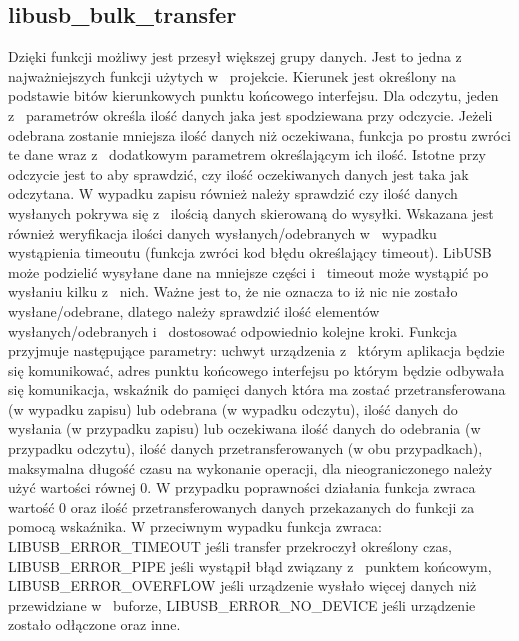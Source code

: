 \documentclass{BscUS}
\begin{document}
\subsection{libusb\_bulk\_transfer}
\indent Dzięki funkcji możliwy jest przesył większej grupy danych. Jest to jedna z~ najważniejszych funkcji użytych w~ projekcie.
Kierunek jest określony na podstawie bitów kierunkowych punktu końcowego interfejsu.
Dla odczytu, jeden z~ parametrów określa ilość danych jaka jest spodziewana przy odczycie. Jeżeli odebrana zostanie mniejsza ilość danych niż oczekiwana, funkcja po prostu zwróci te dane wraz z~ dodatkowym parametrem określającym ich ilość. Istotne przy odczycie jest to aby sprawdzić, czy ilość oczekiwanych danych jest taka jak odczytana.
W wypadku zapisu również należy sprawdzić czy ilość danych wysłanych pokrywa się z~ ilością danych skierowaną do wysyłki.
Wskazana jest również weryfikacja ilości danych wysłanych/odebranych w~ wypadku wystąpienia timeoutu (funkcja zwróci kod błędu określający timeout). LibUSB może podzielić wysyłane dane na mniejsze części i~ timeout może wystąpić po wysłaniu kilku z~ nich. Ważne jest to, że nie oznacza to iż nic nie zostało wysłane/odebrane, dlatego należy sprawdzić ilość elementów wysłanych/odebranych i~ dostosować odpowiednio kolejne kroki.
Funkcja przyjmuje następujące parametry: uchwyt urządzenia z~ którym aplikacja będzie się komunikować, adres punktu końcowego interfejsu po którym będzie odbywała się komunikacja, wskaźnik do pamięci danych która ma zostać przetransferowana (w wypadku zapisu) lub odebrana (w wypadku odczytu), ilość danych do wysłania (w przypadku zapisu) lub oczekiwana ilość danych do odebrania (w przypadku odczytu), ilość danych przetransferowanych (w obu przypadkach), maksymalna długość czasu na wykonanie operacji, dla nieograniczonego należy użyć wartości równej 0.
W przypadku poprawności działania funkcja zwraca wartość 0 oraz ilość przetransferowanych danych przekazanych do funkcji za pomocą wskaźnika.
W przeciwnym wypadku funkcja zwraca: LIBUSB\_ERROR\_TIMEOUT jeśli transfer przekroczył określony czas, LIBUSB\_ERROR\_PIPE jeśli wystąpił błąd związany z~ punktem końcowym, LIBUSB\_ERROR\_OVERFLOW jeśli urządzenie wysłało więcej danych niż przewidziane w~ buforze, LIBUSB\_ERROR\_NO\_DEVICE jeśli urządzenie zostało odłączone oraz inne.
\end{document}
